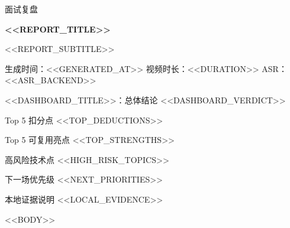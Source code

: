 \documentclass[a4paper,11pt]{article}
\begin{document}
\begin{titlepage}
\thispagestyle{empty}
\centering
{\Large 面试复盘\par}
\vspace{0.6cm}
{\Huge\bfseries <<REPORT_TITLE>>\par}
\vspace{0.35cm}
{\large <<REPORT_SUBTITLE>>\par}
\vspace{0.5cm}
{\small 生成时间：<<GENERATED_AT>> \quad 视频时长：<<DURATION>> \quad ASR：<<ASR_BACKEND>>\par}
\vspace{0.7cm}

\begin{verdictbox}{<<DASHBOARD_TITLE>>：总体结论}
<<DASHBOARD_VERDICT>>
\end{verdictbox}

\vspace{0.35cm}
\begin{minipage}[t]{0.48\textwidth}
\small
\begin{riskbox}{Top 5 扣分点}
<<TOP_DEDUCTIONS>>
\end{riskbox}
\normalsize
\end{minipage}
\hfill
\begin{minipage}[t]{0.48\textwidth}
\small
\begin{betterbox}{Top 5 可复用亮点}
<<TOP_STRENGTHS>>
\end{betterbox}
\normalsize
\end{minipage}

\vspace{0.35cm}
\begin{minipage}[t]{0.48\textwidth}
\small
\begin{drillbox}{高风险技术点}
<<HIGH_RISK_TOPICS>>
\end{drillbox}
\normalsize
\end{minipage}
\hfill
\begin{minipage}[t]{0.48\textwidth}
\small
\begin{evidencebox}{下一场优先级}
<<NEXT_PRIORITIES>>
\end{evidencebox}
\normalsize
\end{minipage}

\vfill
\begin{evidencebox}{本地证据说明}
<<LOCAL_EVIDENCE>>
\end{evidencebox}
\end{titlepage}

\tableofcontents
\newpage

<<BODY>>
\end{document}
